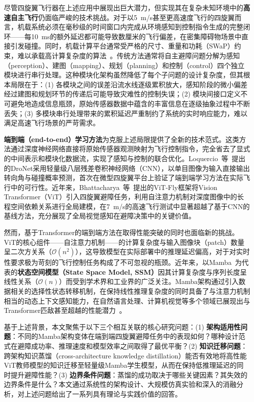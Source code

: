 \documentclass[12pt,a4paper]{article}
\numberwithin{equation}{section}
\numberwithin{figure}{section}
\numberwithin{table}{section}
\begin{document}
尽管四旋翼飞行器在上述应用中展现出巨大潜力，但实现其在复杂未知环境中的\textbf{高速自主飞行}仍面临严峻的技术挑战。对于以5~m/s甚至更高速度飞行的四旋翼而言，机载系统必须在毫秒级的时间窗口内完成从环境感知到控制指令生成的完整闭环——每10~ms的额外延迟都可能导致数厘米的飞行偏差，在密集障碍物场景中直接引发碰撞。同时，机载计算平台通常受严格的尺寸、重量和功耗（SWaP）约束，难以承载高计算复杂度的算法~。传统方法通常将自主避障问题分解为感知（perception）、建图（mapping）、规划（planning）和控制（control）四个独立模块进行串行处理。这种模块化架构虽然降低了每个子问题的设计复杂度，但其根本局限在于：(1) 各模块之间的误差沿流水线逐级累积放大，感知阶段的微小偏差经过建图和规划环节的传递后可能导致灾难性的控制失误；(2) 模块间接口定义不可避免地造成信息瓶颈，原始传感器数据中蕴含的丰富信息在逐级抽象过程中不断丢失；(3) 多模块串行处理带来的累积延迟严重制约了系统的实时响应能力，难以满足高速飞行场景的严苛需求。

\textbf{端到端（end-to-end）学习方法}为克服上述局限提供了全新的技术范式。这类方法通过深度神经网络直接将原始传感器观测映射为飞行控制指令，完全省去了显式的中间表示和模块化数据流，实现了感知与控制的联合优化。Loquercio~等~\cite{loquercio2018dronet}提出的DroNet采用轻量级八层残差卷积神经网络（CNN），以单目图像为输入直接输出转向角与碰撞概率预测，首次在微型四旋翼平台上验证了端到端学习方法在实际飞行中的可行性。近年来，Bhattacharya~等~\cite{bhattacharya2024vitfly}提出的ViT-Fly框架将Vision Transformer（ViT）引入四旋翼避障任务，利用自注意力机制对深度图像中的长程空间依赖关系进行全局建模，在7~m/s的高速飞行测试中显著超越了基于CNN的基线方法，充分展现了全局视觉感知在避障决策中的关键价值。

然而，基于Transformer的端到端方法在取得性能突破的同时也面临新的挑战。ViT的核心组件——自注意力机制——的计算复杂度与输入图像块（patch）数量呈二次方关系（$\mathcal{O}(n^2)$），这导致模型在实际部署中的推理延迟偏高，对于对实时性要求极为苛刻的飞行控制任务构成了不可忽视的瓶颈。近年来，以Mamba~\cite{gu2023mamba}为代表的\textbf{状态空间模型（State Space Model, SSM）}因其计算复杂度与序列长度呈线性关系（$\mathcal{O}(n)$）而受到学术界和工业界的广泛关注。Mamba架构通过引入数据相关的选择性状态转移机制，在保持线性推理复杂度的同时具备了与注意力机制相当的动态上下文感知能力，在自然语言处理、计算机视觉等多个领域已展现出与Transformer匹敌甚至超越的性能潜力~\cite{liu2024vmamba,hatamizadeh2024mambavision}。

基于上述背景，本文聚焦于以下三个相互关联的核心研究问题：(1) \textbf{架构适用性问题}：不同的Mamba架构变体在端到端四旋翼避障任务中的表现如何？哪种设计范式在避障成功率、推理速度和模型效率之间取得了最优平衡？(2) \textbf{知识迁移问题}：跨架构知识蒸馏（cross-architecture knowledge distillation）能否有效地将高性能ViT教师模型的知识迁移至轻量级Mamba学生模型，从而在保持低推理延迟的同时提升避障性能？(3) \textbf{边界条件问题}：蒸馏的成功取决于哪些关键因素？其失效的边界条件是什么？本文通过系统性的架构设计、大规模仿真实验和深入的消融分析，对上述问题给出了一系列具有理论与实践价值的回答。
\end{document}
